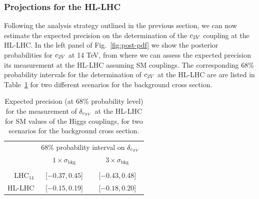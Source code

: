 \subsubsection{Projections for the HL-LHC}

Following the analysis strategy outlined in the previous section,
we can now estimate the expected precision on the 
determination of the $c_{2V}$ coupling at the HL-LHC.
%
In the left panel of Fig.~\ref{fig:post-pdf} we show the
posterior probabilities for $c_{2V}$ at 14 TeV,
from where we can assess the expected precision  
       its measurement at the HL-LHC assuming SM couplings.
The corresponding 68\% probability intervals for the determination of $c_{2V}$ at the HL-LHC 
are are listed in Table~\ref{tab:resultsdcvv} for two different 
scenarios for the background cross section.
\begin{table}[h!]
\begin{center}
  \begin{tabular}{r|@{\hskip 0.15in}c @{\hskip 0.2in}c}
  	\toprule[1pt]
  	&\multicolumn{2}{c}{68\% probability interval on $\delta_{c_{2V}}$}\\[0.1cm]
    & $1\times\sigma_\text{bkg}$&
    $3\times\sigma_\text{bkg}$ \\[0.1cm]
\hline
 & & \\[-0.3cm]
LHC$_{14}$ & [$-0.37$,\,$0.45$] & [$-0.43$,\,0.48] \\[0.2cm]
HL-LHC & [$-0.15$,\,0.19] & [$-0.18$,\,0.20]\\[0.2cm]
\bottomrule[1pt]
\end{tabular}
\end{center}
\vspace{-0.3cm}
\caption{\small Expected precision (at 68\% probability level) for
  the measurement of $\delta_{c_{2V}}$ at the HL-LHC for
  SM values of the Higgs couplings, for two scenarios for the background cross section.
  \label{tab:resultsdcvv}
}
\end{table}

